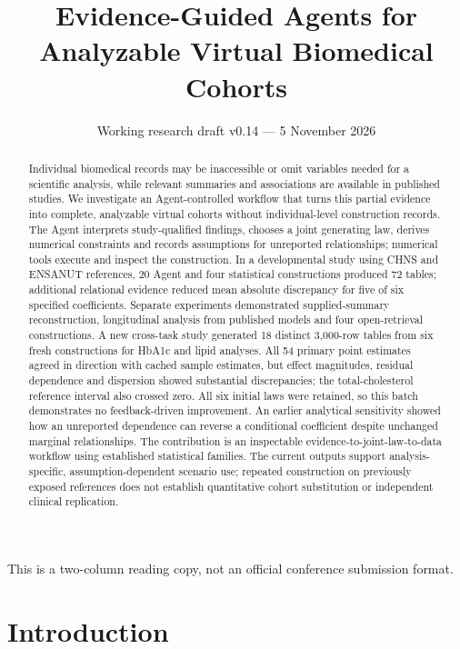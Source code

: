 \documentclass[10pt,twocolumn]{article}
\title{Evidence-Guided Agents for Analyzable Virtual Biomedical Cohorts}
\author{\small Working research draft v0.14 --- 5 November 2026}
\date{}
\begin{document}
\maketitle
\begingroup\footnotesize\noindent This is a two-column reading copy, not an official conference submission format.\par\endgroup
\begin{abstract}

Individual biomedical records may be inaccessible or omit variables needed for a scientific analysis, while relevant summaries and associations are available in published studies. We investigate an Agent-controlled workflow that turns this partial evidence into complete, analyzable virtual cohorts without individual-level construction records. The Agent interprets study-qualified findings, chooses a joint generating law, derives numerical constraints and records assumptions for unreported relationships; numerical tools execute and inspect the construction. In a developmental study using CHNS and ENSANUT references, 20 Agent and four statistical constructions produced 72 tables; additional relational evidence reduced mean absolute discrepancy for five of six specified coefficients. Separate experiments demonstrated supplied-summary reconstruction, longitudinal analysis from published models and four open-retrieval constructions. A new cross-task study generated 18 distinct 3,000-row tables from six fresh constructions for HbA1c and lipid analyses. All 54 primary point estimates agreed in direction with cached sample estimates, but effect magnitudes, residual dependence and dispersion showed substantial discrepancies; the total-cholesterol reference interval also crossed zero. All six initial laws were retained, so this batch demonstrates no feedback-driven improvement. An earlier analytical sensitivity showed how an unreported dependence can reverse a conditional coefficient despite unchanged marginal relationships. The contribution is an inspectable evidence-to-joint-law-to-data workflow using established statistical families. The current outputs support analysis-specific, assumption-dependent scenario use; repeated construction on previously exposed references does not establish quantitative cohort substitution or independent clinical replication.

\end{abstract}

\section{Introduction}
\end{document}
